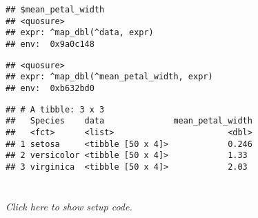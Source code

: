 \documentclass[]{book}
\newenvironment{Shaded}{\begin{snugshade}}{\end{snugshade}}
\newcommand{\ControlFlowTok}[1]{\textcolor[rgb]{0.13,0.29,0.53}{\textbf{#1}}}
\newcommand{\DataTypeTok}[1]{\textcolor[rgb]{0.13,0.29,0.53}{#1}}
\newcommand{\KeywordTok}[1]{\textcolor[rgb]{0.13,0.29,0.53}{\textbf{#1}}}
\newcommand{\NormalTok}[1]{#1}
\newcommand{\OperatorTok}[1]{\textcolor[rgb]{0.81,0.36,0.00}{\textbf{#1}}}
\newcommand{\StringTok}[1]{\textcolor[rgb]{0.31,0.60,0.02}{#1}}
\begin{document}
\begin{verbatim}
## $mean_petal_width
## <quosure>
## expr: ^map_dbl(^data, expr)
## env:  0x9a0c148
\end{verbatim}

\begin{Shaded}
\end{Shaded}

\begin{verbatim}
## <quosure>
## expr: ^map_dbl(^mean_petal_width, expr)
## env:  0xb632bd0
\end{verbatim}

\begin{Shaded}
\end{Shaded}

\begin{verbatim}
## # A tibble: 3 x 3
##   Species    data              mean_petal_width
##   <fct>      <list>                       <dbl>
## 1 setosa     <tibble [50 x 4]>            0.246
## 2 versicolor <tibble [50 x 4]>            1.33 
## 3 virginica  <tibble [50 x 4]>            2.03
\end{verbatim}

\hypertarget{section-2}{%
\section{}\label{section-2}}

\emph{Click here to show setup code.}

\begin{Shaded}
\end{Shaded}
\end{document}
